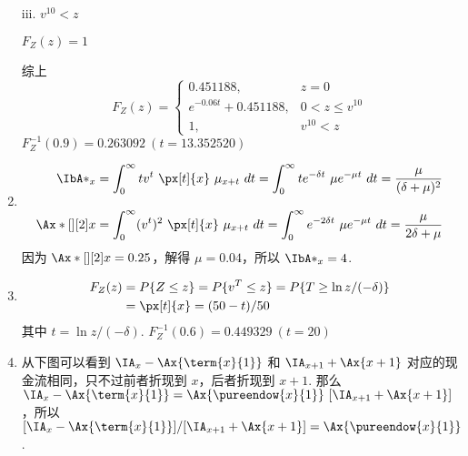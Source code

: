 \documentclass[utf8]{ctexart}
\def\lt{<}
\begin{document}
\begin{enumerate}
    iii. $v^{10}\lt z$

    $F_{Z}(z) = 1$

    综上
    $$F_{Z}(z) = \begin{cases}
        0.451188, & z = 0\\
        e^{-0.06t} + 0.451188, & 0\lt z\le v^{10}\\
        1, & v^{10}\lt z
    \end{cases}$$
    $F_{Z}^{-1}(0.9) = 0.263092~(t=13.352520)$

    \item \begin{align*}
        \IbA*_{x} & = \int_{0}^{\infty} tv^{t}~\px[t]{x}~\mu_{x+t}~dt = \int_{0}^{\infty} te^{-\delta t}~\mu e^{-\mu t}~dt = \frac{\mu}{(\delta+\mu)^{2}}\\[2ex]
        \Ax*[][2]{x} & = \int_{0}^{\infty} (v^{t})^{2}~\px[t]{x}~\mu_{x+t}~dt = \int_{0}^{\infty} e^{-2\delta t}~\mu e^{-\mu t}~dt = \frac{\mu}{2\delta + \mu}
    \end{align*}
    因为 $\Ax*[][2]{x} = 0.25$，解得 $\mu = 0.04$，所以 $\IbA*_{x} = 4$.

    \item \begin{align*}
        F_{Z}(z) & = P\{Z\le z\} = P\{v^{T}\le z\} = P\{T\ge\ln z/(-\delta)\}\\
        & = \px[t]{x} = (50-t)/50
    \end{align*}
    其中 $t = \ln z/(-\delta)$. $F_{Z}^{-1}(0.6) = 0.449329~(t=20)$

    \item 从下图可以看到 $\IA_{x}-\Ax{\term{x}{1}}$ 和 $\IA_{x+1} + \Ax{x+1}$ 对应的现金流相同，只不过前者折现到 $x$，后者折现到 $x+1$. 那么 $\IA_{x}-\Ax{\term{x}{1}} = \Ax{\pureendow{x}{1}}~[\IA_{x+1} + \Ax{x+1}]$，所以 $[\IA_{x}-\Ax{\term{x}{1}}]/[\IA_{x+1} + \Ax{x+1}] = \Ax{\pureendow{x}{1}}$.

\end{enumerate}
\end{document}
